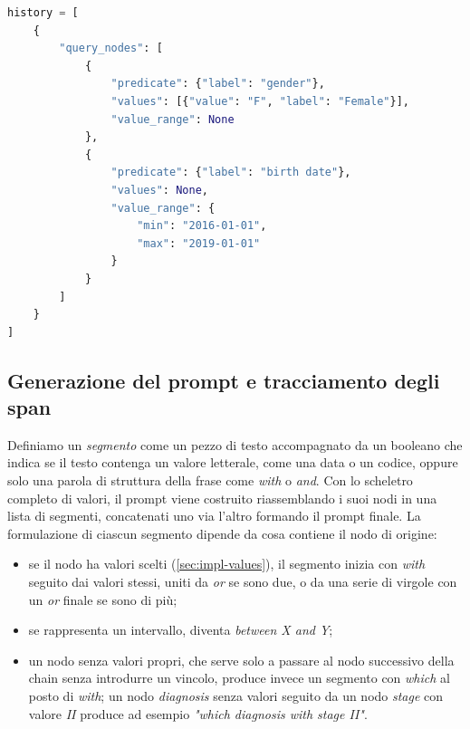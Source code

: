 \documentclass[12pt,a4paper,openright,twoside]{book}
\begin{document}
\begin{lstlisting}[language=Python, caption={Lo stesso scheletro di \cref{lst:skeleton-example}, dopo il riempimento: elenco discreto per il campo categoriale, intervallo per quello di tipo data.}, label={lst:filled-nodes}]
history = [
    {
        "query_nodes": [
            {
                "predicate": {"label": "gender"},
                "values": [{"value": "F", "label": "Female"}],
                "value_range": None
            },
            {
                "predicate": {"label": "birth date"},
                "values": None,
                "value_range": {
                    "min": "2016-01-01",
                    "max": "2019-01-01"
                }
            }
        ]
    }
]
\end{lstlisting}

\subsection{Generazione del prompt e tracciamento degli span}
\label{sec:impl-phrasing}

Definiamo un \textit{segmento} come un pezzo di testo accompagnato da un
booleano che indica se il testo contenga un valore letterale, come una data o un
codice, oppure solo una parola di struttura della frase come \emph{with} o
\emph{and}. Con lo scheletro completo di valori, il prompt viene costruito
riassemblando i suoi nodi in una lista di segmenti, concatenati uno via l'altro
formando il prompt finale. La formulazione di ciascun segmento dipende da cosa
contiene il nodo di origine:

\begin{itemize}
    \item se il nodo ha valori scelti (\cref{sec:impl-values}), il segmento
          inizia con \emph{with} seguito dai valori stessi, uniti da \emph{or}
          se sono due, o da una serie di virgole con un \emph{or} finale se sono
          di più;
    \item se rappresenta un intervallo, diventa \emph{between X and Y};
    \item un nodo senza valori propri, che serve solo a passare al nodo
          successivo della chain senza introdurre un vincolo, produce invece un
          segmento con \emph{which} al posto di \emph{with}; un nodo
          \emph{diagnosis} senza valori seguito da un nodo \emph{stage} con
          valore \emph{II} produce ad esempio \emph{"which diagnosis with stage
              II"}.
\end{itemize}
\end{document}

